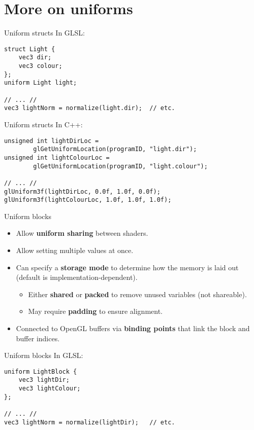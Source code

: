 \part{More on uniforms}
\frame{\partpage}

\begin{frame}[fragile]{Uniform structs}
In GLSL:
	\begin{lstlisting}
struct Light {
	vec3 dir;
	vec3 colour;
};
uniform Light light;

// ... //
vec3 lightNorm = normalize(light.dir);	// etc.
	\end{lstlisting}
\end{frame}

\begin{frame}[fragile]{Uniform structs}
In C++:
	\begin{lstlisting}
unsigned int lightDirLoc =
		glGetUniformLocation(programID, "light.dir");
unsigned int lightColourLoc =
		glGetUniformLocation(programID, "light.colour");

// ... //
glUniform3f(lightDirLoc, 0.0f, 1.0f, 0.0f);
glUniform3f(lightColourLoc, 1.0f, 1.0f, 1.0f);
	\end{lstlisting}
\end{frame}

\begin{frame}{Uniform blocks}
	\begin{itemize}
		\pause\item Allow \textbf{uniform sharing} between shaders.
		\pause\item Allow setting multiple values at once.
		\pause\item Can specify a \textbf{storage mode} to determine how the memory is laid out (default is implementation-dependent).
		\begin{itemize}
			\pause\item Either \textbf{shared} or \textbf{packed} to remove unused variables (not shareable).
			\pause\item May require \textbf{padding} to ensure alignment.
		\end{itemize}
		\pause\item Connected to OpenGL buffers via \textbf{binding points} that link the block and buffer indices.
	\end{itemize}
\end{frame}

\begin{frame}[fragile]{Uniform blocks}
In GLSL:
	\begin{lstlisting}
uniform LightBlock {
	vec3 lightDir;
	vec3 lightColour;
};

// ... //
vec3 lightNorm = normalize(lightDir);	// etc.
	\end{lstlisting}
\end{frame}


